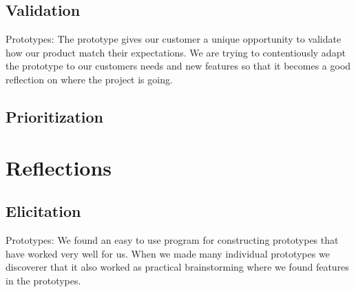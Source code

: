 \documentclass[10pt,a4paper]{article}
\begin{document}
\subsection{Validation}
Prototypes: The prototype gives our customer a unique opportunity to validate how our product match their expectations. We are trying to contentiously adapt the prototype to our customers needs and new features so that it becomes a good reflection on where the project is going.

\subsection{Prioritization}



\section{Reflections}

\subsection{Elicitation}
Prototypes: We found an easy to use program for constructing prototypes that have worked very well for us. When we made many individual prototypes we discoverer that it also worked as practical brainstorming where we found features in the prototypes.
\end{document}
